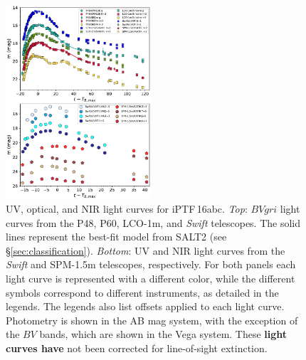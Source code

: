 \documentclass[twocolumn]{aastex61}
\newcommand{\abc}{iPTF\,16abc}
\begin{document}
\begin{figure}[ht]
  \centering
  \includegraphics[width=0.48\textwidth]{lightcurve.pdf}
  \caption{
  UV, optical, and NIR light curves for \abc. \textit{Top}: $BVgri$ light
  curves from the P48, P60, LCO-1m, and \textit{Swift} telescopes. The solid
  lines represent the best-fit model from SALT2 (see
  \S\ref{sec:classification}). \textit{Bottom}: UV and NIR light curves from
  the \textit{Swift} and SPM-1.5m telescopes, respectively. For both panels
  each light curve is represented with a different color, while the different
  symbols correspond to different instruments, as detailed in the legends. The
  legends also list offsets applied to each light curve. Photometry is shown
  in the AB mag system, with the exception of the $BV$ bands, which are shown
  in the Vega system. These \textbf{light curves have} not been corrected for
  line-of-sight extinction.}
  \label{fig:ugly_LC}
\end{figure}



\end{document}
